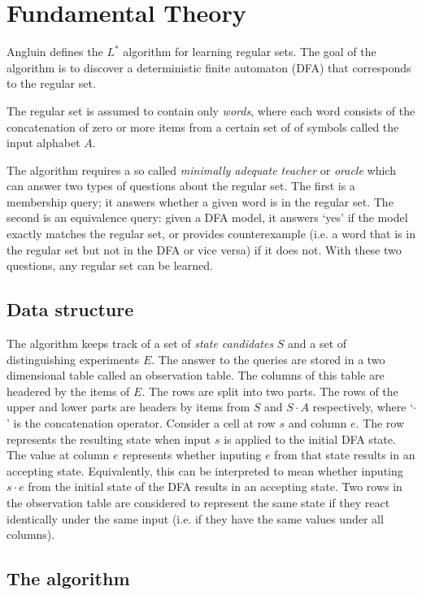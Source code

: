 \documentclass[multi,crop=false,class=article]{standalone}
\newcommand{\concat}{\cdot}
\begin{document}
\section{Fundamental Theory}
\label{sec:fundamental-theory}

Angluin defines the $L^*$ algorithm for learning regular sets. The goal of the
algorithm is to discover a deterministic finite automaton (DFA) that corresponds
to the regular set.

The regular set is assumed to contain only \textit{words}, where each word
consists of the concatenation of zero or more items from a certain set of of
symbols called the input alphabet $A$.

The algorithm requires a so called \textit{minimally adequate teacher} or
\textit{oracle} which can answer two types of questions about the regular set.
The first is a membership query; it answers whether a given word is in the
regular set. The second is an equivalence query: given a DFA model, it answers
`yes' if the model exactly matches the regular set, or provides counterexample
(i.e. a word that is in the regular set but not in the DFA or vice versa) if it
does not. With these two questions, any regular set can be learned.

\subsection {Data structure}

The algorithm keeps track of a set of \textit{state candidates} $S$ and a set of
distinguishing experiments  $E$. The answer to the queries are stored in a two
dimensional table called an observation table. The columns of this table are
headered by the items of $E$. The rows are split into two parts. The rows of the
upper and lower parts are headers by items from $S$ and $S \concat A$
respectively, where `$\concat$' is the concatenation operator. Consider a cell
at row $s$ and column $e$. The row represents the resulting state when input $s$
is applied to the initial DFA state. The value at column $e$ represents whether
inputing $e$ from that state results in an accepting state. Equivalently, this
can be interpreted to mean whether inputing $s \concat e$ from the initial state
of the DFA results in an accepting state. Two rows in the observation table are
considered to represent the same state if they react identically under the same
input (i.e. if they have the same values under all columns).

\subsection {The algorithm}
\end{document}
